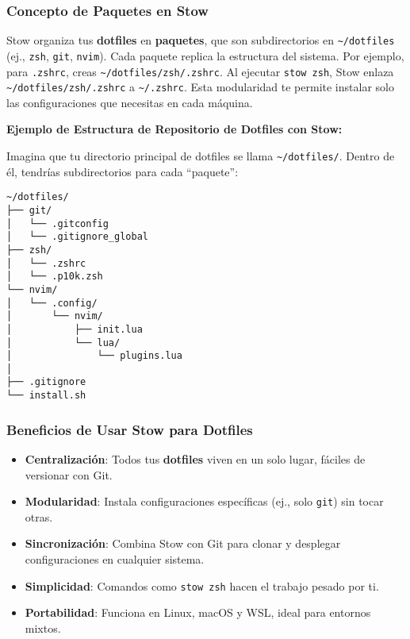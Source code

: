 \documentclass[
  jou,
  floatsintext,
  longtable,
  a4paper,
  nolmodern,
  notxfonts,
  notimes,
  colorlinks=true,linkcolor=blue,citecolor=blue,urlcolor=blue]{apa7}
\providecommand{\tightlist}{%
  \setlength{\itemsep}{0pt}\setlength{\parskip}{0pt}}
\begin{document}
\subsubsection{Concepto de Paquetes en
Stow}\label{concepto-de-paquetes-en-stow}

Stow organiza tus \textbf{dotfiles} en \textbf{paquetes}, que son
subdirectorios en \texttt{\textasciitilde{}/dotfiles} (ej.,
\texttt{zsh}, \texttt{git}, \texttt{nvim}). Cada paquete replica la
estructura del sistema. Por ejemplo, para \texttt{.zshrc}, creas
\texttt{\textasciitilde{}/dotfiles/zsh/.zshrc}. Al ejecutar
\texttt{stow\ zsh}, Stow enlaza
\texttt{\textasciitilde{}/dotfiles/zsh/.zshrc} a
\texttt{\textasciitilde{}/.zshrc}. Esta modularidad te permite instalar
solo las configuraciones que necesitas en cada máquina.

\textbf{Ejemplo de Estructura de Repositorio de Dotfiles con Stow:}

Imagina que tu directorio principal de dotfiles se llama
\texttt{\textasciitilde{}/dotfiles/}. Dentro de él, tendrías
subdirectorios para cada ``paquete'':

\begin{verbatim}
~/dotfiles/
├── git/
│   └── .gitconfig
│   └── .gitignore_global
├── zsh/
│   └── .zshrc
│   └── .p10k.zsh
└── nvim/
│   └── .config/
│       └── nvim/
│           ├── init.lua
│           └── lua/
│               └── plugins.lua
│
├── .gitignore
└── install.sh
\end{verbatim}

\subsubsection{Beneficios de Usar Stow para
Dotfiles}\label{beneficios-de-usar-stow-para-dotfiles}

\begin{itemize}
\tightlist
\item
  \textbf{Centralización}: Todos tus \textbf{dotfiles} viven en un solo
  lugar, fáciles de versionar con Git.
\item
  \textbf{Modularidad}: Instala configuraciones específicas (ej., solo
  \texttt{git}) sin tocar otras.
\item
  \textbf{Sincronización}: Combina Stow con Git para clonar y desplegar
  configuraciones en cualquier sistema.
\item
  \textbf{Simplicidad}: Comandos como \texttt{stow\ zsh} hacen el
  trabajo pesado por ti.
\item
  \textbf{Portabilidad}: Funciona en Linux, macOS y WSL, ideal para
  entornos mixtos.
\end{itemize}
\end{document}
